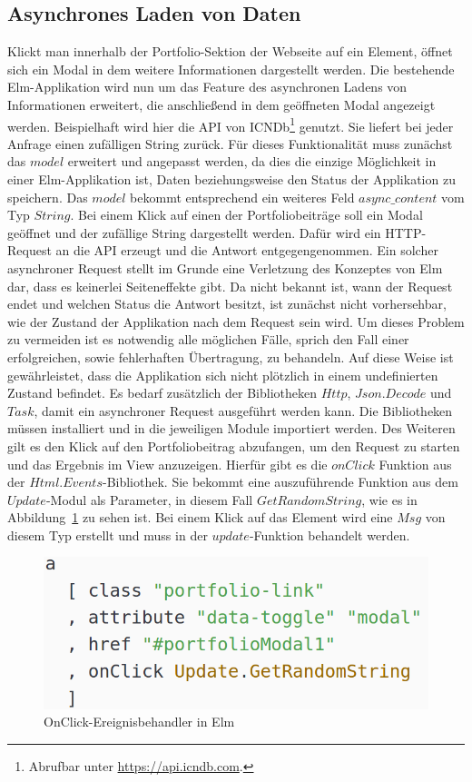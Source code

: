 \subsection{Asynchrones Laden von Daten}
\label{sec:async-laden}
Klickt man innerhalb der Portfolio-Sektion der Webseite auf ein Element, öffnet sich ein Modal in dem weitere Informationen dargestellt werden. Die bestehende Elm-Applikation wird nun um das Feature des asynchronen Ladens von Informationen erweitert, die anschließend in dem geöffneten Modal angezeigt werden. Beispielhaft wird hier die \ac{API} von \ac{ICNDb}\footnote{Abrufbar unter \url{https://api.icndb.com}.} genutzt. Sie liefert bei jeder Anfrage einen zufälligen String zurück.
Für dieses Funktionalität muss zunächst das $model$ erweitert und angepasst werden, da dies die einzige Möglichkeit in einer Elm-Applikation ist, Daten beziehungsweise den Status der Applikation zu speichern. Das $model$ bekommt entsprechend ein weiteres Feld $async\_content$ vom Typ $String$.
Bei einem Klick auf einen der Portfoliobeiträge soll ein Modal geöffnet und der zufällige String dargestellt werden. Dafür wird ein \ac{HTTP}-Request an die \ac{API} erzeugt und die Antwort entgegengenommen.
Ein solcher asynchroner Request stellt im Grunde eine Verletzung des Konzeptes von Elm dar, dass es keinerlei Seiteneffekte gibt. Da nicht bekannt ist, wann der Request endet und welchen Status die Antwort besitzt, ist zunächst nicht vorhersehbar, wie der Zustand der Applikation nach dem Request sein wird. Um dieses Problem zu vermeiden ist es notwendig alle möglichen Fälle, sprich den Fall einer erfolgreichen, sowie fehlerhaften Übertragung, zu behandeln. Auf diese Weise ist gewährleistet, dass die Applikation sich nicht plötzlich in einem undefinierten Zustand befindet. Es bedarf zusätzlich der Bibliotheken $Http$, $Json.Decode$ und $Task$, damit ein asynchroner Request ausgeführt werden kann. Die Bibliotheken müssen installiert und in die jeweiligen Module importiert werden. Des Weiteren gilt es den Klick auf den Portfoliobeitrag abzufangen, um den Request zu starten und das Ergebnis im View anzuzeigen. Hierfür gibt es die $onClick$ Funktion aus der $Html.Events$-Bibliothek. Sie bekommt eine auszuführende Funktion aus dem $Update$-Modul als Parameter, in diesem Fall $GetRandomString$, wie es in Abbildung~\ref{fig:portfolio-async} zu sehen ist. Bei einem Klick auf das Element wird eine $Msg$ von diesem Typ erstellt und muss in der $update$-Funktion behandelt werden.
\begin{figure}[h]
\centering
\includegraphics[scale=0.4]{img/portfolio-async.png}
\caption{OnClick-Ereignisbehandler in Elm}\label{fig:portfolio-async}
\end{figure}
